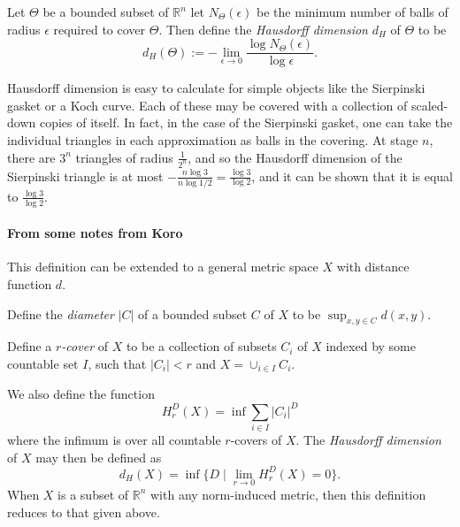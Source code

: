 \documentclass[12pt]{article}
\newcommand{\R}{\mathbb{R}}
\begin{document}
Let $\Theta$ be a bounded subset of $\R^n$
let $N_{\Theta}(\epsilon)$ be the minimum number of balls of radius $\epsilon$ required to cover $\Theta$.  Then define the \emph{Hausdorff dimension} 
$d_H$ of $\Theta$ to be 
\[ d_H (\Theta):= - \lim_{\epsilon \rightarrow 0} \frac{\log N_{\Theta}(\epsilon)}{\log \epsilon}.\]

Hausdorff dimension is easy to calculate for simple objects like the Sierpinski gasket or a Koch curve.  Each of these may be covered with a collection of scaled-down copies of itself.  In fact, in the case of the Sierpinski gasket, one can take the individual triangles in each approximation as balls in the covering.  At stage $n$, there are $3^n$ triangles of radius $\frac{1}{2^n}$, and so the Hausdorff dimension of the Sierpinski triangle is at most $- \frac{n \log 3}{n \log 1/2} = \frac{\log 3}{\log 2}$, and it can be shown that it is equal to $\frac{\log 3}{\log 2}$.

\paragraph{From some notes from Koro} This definition can be extended to a general metric space $X$ with distance function $d$.

Define the \emph{diameter} $|C|$ of a bounded subset $C$ of $X$ to be $\sup_{x,y\in C} d(x,y)$. 

Define a \emph{ $r$-cover}
of $X$ to be a collection of subsets $C_i$ of $X$ indexed by some countable set $I$, such that $|C_i| < r$ and $X = \cup_{i\in I} C_i$.

We also define the  function $$H^D_r (X) = \inf \sum_{i\in I} |C_i|^D$$ where the infimum is over all countable $r$-covers of $X$.  
The \emph{Hausdorff dimension} of $X$ may then be defined as $$d_H (X)=\inf \{ D\mid \lim_{r\rightarrow 0} H^D_r(X)=0 \}.$$
When $X$ is a subset of $\R^n$ with any  norm-induced metric, then this definition reduces to that given above.

\end{document}

